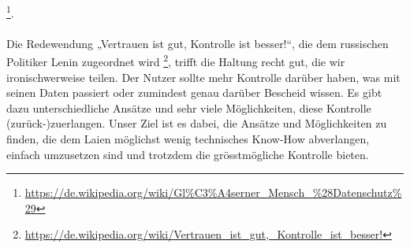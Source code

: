 \footnote{\url{https://de.wikipedia.org/wiki/Gl\%C3\%A4serner_Mensch_\%28Datenschutz\%29}}.
\\
\\
Die Redewendung „Vertrauen ist gut, Kontrolle ist besser!“, die dem russischen Politiker Lenin zugeordnet wird
\footnote{\url{https://de.wikipedia.org/wiki/Vertrauen_ist_gut,_Kontrolle_ist_besser!}},
trifft die Haltung recht gut, die wir ironischwerweise teilen. Der Nutzer sollte mehr Kontrolle darüber haben, was mit seinen Daten passiert oder zumindest genau darüber Bescheid wissen. Es gibt dazu unterschiedliche Ansätze und sehr viele Möglichkeiten, diese Kontrolle (zurück-)zuerlangen. Unser Ziel ist es dabei, die Ansätze und Möglichkeiten zu finden, die dem Laien möglichst wenig technisches Know-How abverlangen, einfach umzusetzen sind und trotzdem die grösstmögliche Kontrolle bieten.

